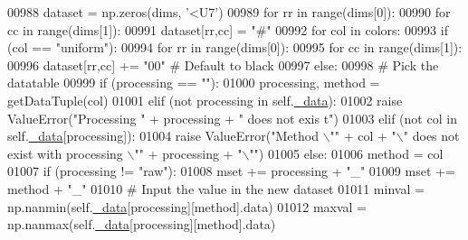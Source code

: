 \begin{DoxyCode}
00988         dataset = np.zeros(dims, \textcolor{stringliteral}{'<U7'})
00989         \textcolor{keywordflow}{for} rr \textcolor{keywordflow}{in} range(dims[0]):
00990             \textcolor{keywordflow}{for} cc \textcolor{keywordflow}{in} range(dims[1]):
00991                 dataset[rr,cc] = \textcolor{stringliteral}{"#"}
00992         \textcolor{keywordflow}{for} col \textcolor{keywordflow}{in} colors:
00993             \textcolor{keywordflow}{if} (col == \textcolor{stringliteral}{"uniform"}):
00994                 \textcolor{keywordflow}{for} rr \textcolor{keywordflow}{in} range(dims[0]):
00995                     \textcolor{keywordflow}{for} cc \textcolor{keywordflow}{in} range(dims[1]):
00996                         dataset[rr,cc] += \textcolor{stringliteral}{"00"} \textcolor{comment}{# Default to black}
00997             \textcolor{keywordflow}{else}:
00998                 \textcolor{comment}{# Pick the datatable}
00999                 \textcolor{keywordflow}{if} (processing == \textcolor{stringliteral}{""}):
01000                     processing, method = getDataTuple(col)
01001                 \textcolor{keywordflow}{elif} (\textcolor{keywordflow}{not} processing \textcolor{keywordflow}{in} self.\hyperlink{classnavicom_1_1navicom_1_1NaviCom_a407b2b5c30a5652ee85c4be54b3e6679}{_data}):
01002                     \textcolor{keywordflow}{raise} ValueError(\textcolor{stringliteral}{"Processing "} + processing + \textcolor{stringliteral}{" does not exis
      t"})
01003                 \textcolor{keywordflow}{elif} (\textcolor{keywordflow}{not} col \textcolor{keywordflow}{in} self.\hyperlink{classnavicom_1_1navicom_1_1NaviCom_a407b2b5c30a5652ee85c4be54b3e6679}{_data}[processing]):
01004                     \textcolor{keywordflow}{raise} ValueError(\textcolor{stringliteral}{"Method \(\backslash\)""} + col + \textcolor{stringliteral}{"\(\backslash\)" does not exist with 
      processing \(\backslash\)""} + processing + \textcolor{stringliteral}{"\(\backslash\)""})
01005                 \textcolor{keywordflow}{else}:
01006                     method = col
01007                 \textcolor{keywordflow}{if} (processing != \textcolor{stringliteral}{"raw"}):
01008                     mset += processing + \textcolor{stringliteral}{"\_"}
01009                 mset += method + \textcolor{stringliteral}{"\_"}
01010                 \textcolor{comment}{# Input the value in the new dataset}
01011                 minval = np.nanmin(self.\hyperlink{classnavicom_1_1navicom_1_1NaviCom_a407b2b5c30a5652ee85c4be54b3e6679}{_data}[processing][method].data)
01012                 maxval = np.nanmax(self.\hyperlink{classnavicom_1_1navicom_1_1NaviCom_a407b2b5c30a5652ee85c4be54b3e6679}{_data}[processing][method].data)

\end{DoxyCode}
